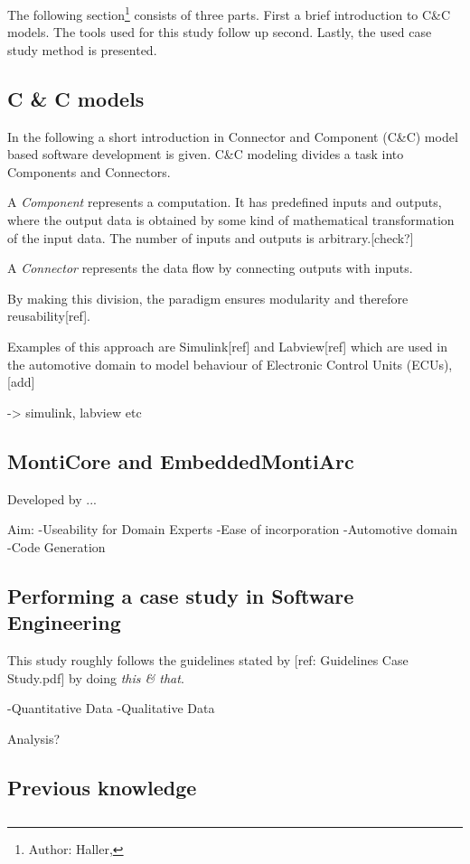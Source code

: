 The following section\footnote{Author: Haller, } consists of three parts. First a brief introduction to C\&C models. The tools used for this study follow up second. Lastly, the used case study method is presented.


\subsection{C \& C models}

In the following a short introduction in Connector and Component (C\&C) model based software development is given. C\&C modeling divides a task into Components and Connectors. 

A \emph{Component} represents a computation. It has predefined inputs and outputs, where the output data is obtained by some kind of mathematical transformation of the input data. The number of inputs and outputs is arbitrary.[check?]

A \emph{Connector} represents the data flow by connecting outputs with inputs.  

By making this division, the paradigm ensures modularity and therefore reusability[ref].

Examples of this approach are Simulink[ref] and Labview[ref] which are used in the automotive domain to model behaviour of Electronic Control Units (ECUs), [add]

-> simulink, labview etc

\subsection{MontiCore and EmbeddedMontiArc}

Developed by ...

Aim:
-Useability for Domain Experts
-Ease of incorporation
-Automotive domain
-Code Generation



\subsection{Performing a case study in Software Engineering}

This study roughly follows the guidelines stated by [ref: Guidelines Case Study.pdf] by doing \emph{this \& that}.

-Quantitative Data
-Qualitative Data

Analysis?


\subsection{Previous knowledge}




\subsection{}